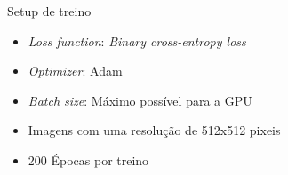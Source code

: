 \begin{frame}{Setup de treino}
  \begin{itemize}
    \item \textit{Loss function}: \textit{Binary cross-entropy loss}
    \item \textit{Optimizer}: Adam
    \item \textit{Batch size}: Máximo possível para a GPU
    \item Imagens com uma resolução de 512x512 pixeis
    \item 200 Épocas por treino
  \end{itemize}
  
\end{frame}